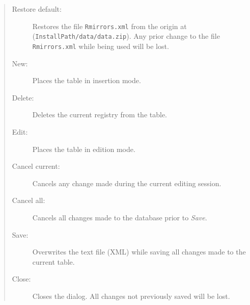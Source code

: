 \begin{quote}
  \begin{footnotesize}
    \begin{description}
      \item[Restore default:]
        Restores the file \texttt{Rmirrors.xml} from the origin at
        (\texttt{InstallPath/data/data.zip}). Any prior change to the
        file \texttt{Rmirrors.xml} while being used will be lost.
      \item[New:]
        Places the table in insertion mode.
      \item[Delete:]
        Deletes the current registry from the table.
      \item[Edit:]
        Places the table in edition mode.
      \item[Cancel current:]
        Cancels any change made during the current editing session.
      \item[Cancel all:]
        Cancels all changes made to the database prior to \textit{Save}.
      \item[Save:]
        Overwrites the text file (XML) while saving all changes made to the current table.
      \item[Close:]
        Closes the dialog. All changes not previously saved will be lost.
    \end{description}
  \end{footnotesize}
\end{quote}
